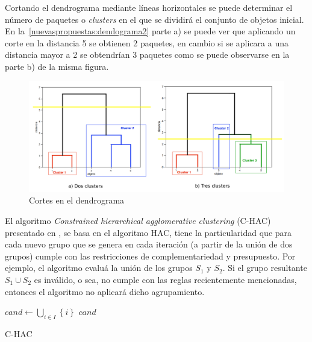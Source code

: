 Cortando el dendrograma mediante líneas horizontales se puede determinar el número de paquetes o \emph{clusters} en el que se dividirá el conjunto de objetos inicial. En la~\autoref{nuevaspropuestas:dendograma2} parte a) se puede ver que aplicando un corte en la distancia 5 se obtienen 2 paquetes, en cambio si se aplicara a una distancia mayor a 2 se obtendrían 3 paquetes como se puede observarse en la parte b) de la misma figura.

\begin{figure}[H]
  \centering
    \includegraphics[width=1\textwidth]{img/dendograma02.png}
  \caption{Cortes en el dendrograma}
  \label{nuevaspropuestas:dendograma2}
\end{figure}

El algoritmo \textit{Constrained hierarchical agglomerative clustering} (C-HAC) presentado en \cite{journals/tkde/Amer-YahiaBCFMZ14}, se basa en el algoritmo HAC, tiene la particularidad que para cada nuevo grupo que se genera en cada iteración (a partir de la unión de dos grupos) cumple con las restricciones de complementariedad y presupuesto. Por ejemplo, el algoritmo evaluá la unión de los grupos $S_1$ y $S_2$. Si el grupo resultante $S_1 \cup S_2$ es inválido, o sea, no cumple con las reglas recientemente mencionadas, entonces el algoritmo no aplicará dicho agrupamiento.

\begin{center}
	\begin{algorithm}[H]
	\DontPrintSemicolon
	\SetAlgoLined
		$cand \leftarrow \bigcup_{i \in I}\left\{i\right\}$\; \label{alg:C-HAC:init}
		\Return $cand$\;
	\caption{C-HAC}\label{alg:C-HAC}
	\end{algorithm}
\end{center}

